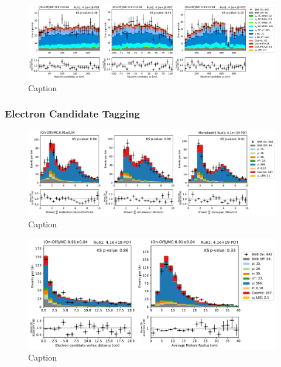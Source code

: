 \begin{figure}
    \centering
    \includegraphics[width=\textwidth]{NueCCsel/Images/run1/pre_vtx.pdf}
    \caption{Caption}
    \label{fig:pre_vtx}
\end{figure}


\subsubsection{Electron Candidate Tagging}

\begin{figure}
    \centering
    \includegraphics[width=\textwidth]{NueCCsel/Images/run1/e_cand_dedx.pdf}
    \caption{Caption}
    \label{fig:e_cand_dedx}
\end{figure}

\begin{figure}
    \centering
    \includegraphics[width=\textwidth]{NueCCsel/Images/run1/e_cand_dist.pdf}
    \caption{Caption}
    \label{fig:e_cand_dist}
\end{figure}

